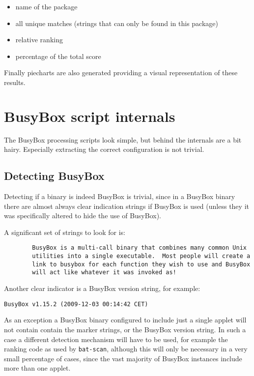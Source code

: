 \documentclass[10pt,a4paper]{article}
\begin{document}
\begin{itemize}
\item name of the package
\item all unique matches (strings that can only be found in this package)
\item relative ranking
\item percentage of the total score
\end{itemize}

Finally piecharts are also generated providing a visual representation of these results.

\section{BusyBox script internals}

The BusyBox processing scripts look simple, but behind the internals are a bit
hairy. Especially extracting the correct configuration is not trivial.

\subsection{Detecting BusyBox}

Detecting if a binary is indeed BusyBox is trivial, since in a BusyBox binary
there are almost always clear indication strings if BusyBox is used (unless
they it was specifically altered to hide the use of BusyBox).

A significant set of strings to look for is:

\begin{verbatim}
        BusyBox is a multi-call binary that combines many common Unix
        utilities into a single executable.  Most people will create a
        link to busybox for each function they wish to use and BusyBox
        will act like whatever it was invoked as!
\end{verbatim}

Another clear indicator is a BusyBox version string, for example:

\begin{verbatim}
BusyBox v1.15.2 (2009-12-03 00:14:42 CET)
\end{verbatim}

As an exception a BusyBox binary configured to include just a single applet
will not contain contain the marker strings, or the BusyBox version string. In
such a case a different detection mechanism will have to be used, for example
the ranking code as used by \texttt{bat-scan}, although this will only be
necessary in a very small percentage of cases, since the vast majority of
BusyBox instances include more than one applet.
\end{document}
